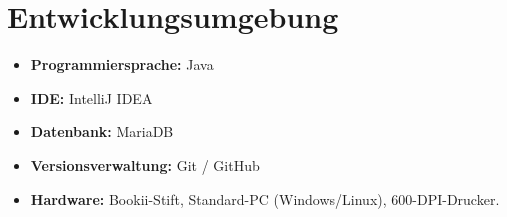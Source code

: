 \documentclass[12pt, a4paper]{article}
\begin{document}
\section{Entwicklungsumgebung}
\begin{itemize}
    \item \textbf{Programmiersprache:} Java
    \item \textbf{IDE:} IntelliJ IDEA
    \item \textbf{Datenbank:} MariaDB
    \item \textbf{Versionsverwaltung:} Git / GitHub
    \item \textbf{Hardware:} Bookii-Stift, Standard-PC (Windows/Linux), 600-DPI-Drucker.
\end{itemize}
\end{document}
